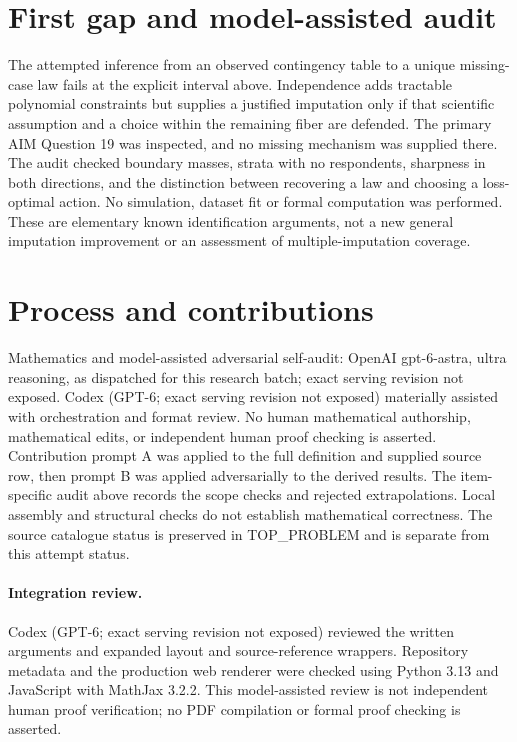 \documentclass[11pt]{article}
\begin{document}
\section{First gap and model-assisted audit}
The attempted inference from an observed contingency table to a unique
missing-case law fails at the explicit interval above. Independence
adds tractable polynomial constraints but supplies a justified imputation
only if that scientific assumption and a choice within the remaining
fiber are defended. The primary AIM Question 19 was inspected, and no
missing mechanism was supplied there. The audit checked boundary masses,
strata with no respondents, sharpness in both directions, and the
distinction between recovering a law and choosing a loss-optimal action.
No simulation, dataset fit or formal computation was performed. These
are elementary known identification arguments, not a new general
imputation improvement or an assessment of multiple-imputation coverage.

\section{Process and contributions}
Mathematics and model-assisted adversarial self-audit: OpenAI gpt-6-astra, ultra reasoning, as dispatched for this research batch; exact serving revision not exposed. Codex (GPT-6; exact serving revision not exposed) materially assisted with orchestration and format review. No human mathematical authorship, mathematical edits, or independent human proof checking is asserted.
Contribution prompt A was applied to the full definition and supplied source row, then prompt B was applied adversarially to the derived results. The item-specific audit above records the scope checks and rejected extrapolations. Local assembly and structural checks do not establish mathematical correctness. The source catalogue status is preserved in TOP\_PROBLEM and is separate from this attempt status.
\paragraph{Integration review.} Codex (GPT-6; exact serving revision not exposed) reviewed the written arguments and expanded layout and source-reference wrappers. Repository metadata and the production web renderer were checked using Python 3.13 and JavaScript with MathJax 3.2.2. This model-assisted review is not independent human proof verification; no PDF compilation or formal proof checking is asserted.
\end{document}
